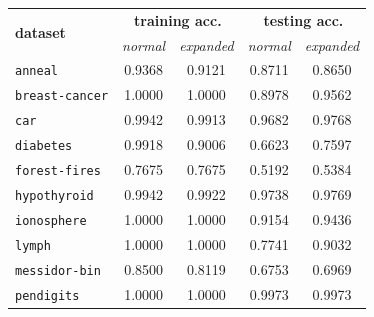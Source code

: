\documentclass[12pt]{report}
\theoremstyle{definition}
\theoremstyle{definition}
\theoremstyle{definition}
\begin{document}
\begin{table}[ht]
    \centering
    \begin{tabular}{lcccc}
    \hline
    \multicolumn{1}{l}{\multirow{2}{*}{\bf dataset}} & \multicolumn{2}{c}{\bf training acc.} & \multicolumn{2}{c}{\bf testing acc.} \\
    \multicolumn{1}{l}{} & \multicolumn{1}{p{2cm}}{\centering \it normal} & \multicolumn{1}{p{2cm}}{\centering \it expanded} & \multicolumn{1}{p{2cm}}{\centering \it normal} & \multicolumn{1}{p{2cm}}{\centering \it expanded} \\
    \hline
    \multicolumn{1}{l}{\tt anneal}        & \multicolumn{1}{c}{0.9368} & \multicolumn{1}{c}{0.9121} & \multicolumn{1}{c}{0.8711} & \multicolumn{1}{c}{0.8650} \\
    \multicolumn{1}{l}{\tt breast-cancer} & \multicolumn{1}{c}{1.0000} & \multicolumn{1}{c}{1.0000} & \multicolumn{1}{c}{0.8978} & \multicolumn{1}{c}{0.9562} \\
    \multicolumn{1}{l}{\tt car}           & \multicolumn{1}{c}{0.9942} & \multicolumn{1}{c}{0.9913} & \multicolumn{1}{c}{0.9682} & \multicolumn{1}{c}{0.9768} \\
    \multicolumn{1}{l}{\tt diabetes}      & \multicolumn{1}{c}{0.9918} & \multicolumn{1}{c}{0.9006} & \multicolumn{1}{c}{0.6623} & \multicolumn{1}{c}{0.7597} \\
    \multicolumn{1}{l}{\tt forest-fires}  & \multicolumn{1}{c}{0.7675} & \multicolumn{1}{c}{0.7675} & \multicolumn{1}{c}{0.5192} & \multicolumn{1}{c}{0.5384} \\
    \multicolumn{1}{l}{\tt hypothyroid}   & \multicolumn{1}{c}{0.9942} & \multicolumn{1}{c}{0.9922} & \multicolumn{1}{c}{0.9738} & \multicolumn{1}{c}{0.9769} \\
    \multicolumn{1}{l}{\tt ionosphere}    & \multicolumn{1}{c}{1.0000} & \multicolumn{1}{c}{1.0000} & \multicolumn{1}{c}{0.9154} & \multicolumn{1}{c}{0.9436} \\
    \multicolumn{1}{l}{\tt lymph}         & \multicolumn{1}{c}{1.0000} & \multicolumn{1}{c}{1.0000} & \multicolumn{1}{c}{0.7741} & \multicolumn{1}{c}{0.9032} \\
    \multicolumn{1}{l}{\tt messidor-bin}  & \multicolumn{1}{c}{0.8500} & \multicolumn{1}{c}{0.8119} & \multicolumn{1}{c}{0.6753} & \multicolumn{1}{c}{0.6969} \\
    \multicolumn{1}{l}{\tt pendigits}     & \multicolumn{1}{c}{1.0000} & \multicolumn{1}{c}{1.0000} & \multicolumn{1}{c}{0.9973} & \multicolumn{1}{c}{0.9973} \\

\end{tabular}
\end{table}
\end{document}
